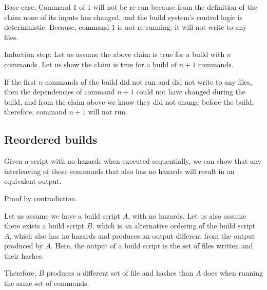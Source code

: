 Base case: Command $1$ of $1$  will not be re-run because from the definition of the claim none of its inputs has changed, and the build system's control logic is deterministic.  Because, command $1$ is not re-running, it will not write to any files.  

Induction step:  Let us assume the above claim is true for a build with $n$ commands.  Let us show the claim is true for a build of $n+1$ commands.

If the first $n$ commands of the build did not run and did not write to any files, then the dependencies of command $n+1$ could not have changed during the build, and from the claim above we know they did not change before the build, therefore, command $n+1$ will not run.

\subsection{Reordered builds}
\label{sec:proof:reorder}

Given a script with no hazards when executed sequentially, we can show that any interleaving of those commands that also has no hazards will result in an equivalent output.

Proof by contradiction.

Let us assume we have a build script $A$, with no hazards.  Let us also assume there exists a build script $B$, which is an alternative ordering of the build script $A$, which also has no hazards and produces an output different from the output produced by $A$.  Here, the output of a build script is the set of files written and their hashes.

Therefore, $B$ produces a different set of file and hashes than $A$ does when running the same set of commands.

